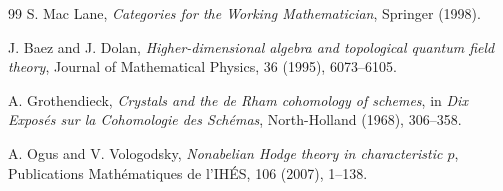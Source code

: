 \documentclass[12pt]{article}
\begin{document}
\begin{thebibliography}{99}
S. Mac Lane,
\textit{Categories for the Working Mathematician},
Springer (1998).

J. Baez and J. Dolan,
\textit{Higher-dimensional algebra and topological quantum field theory},
Journal of Mathematical Physics, 36 (1995), 6073--6105.

A. Grothendieck,
\textit{Crystals and the de Rham cohomology of schemes},
in \textit{Dix Expos\'es sur la Cohomologie des Sch\'emas},
North-Holland (1968), 306--358.

A. Ogus and V. Vologodsky,
\textit{Nonabelian Hodge theory in characteristic $p$},
Publications Math\'ematiques de l'IH\'ES, 106 (2007), 1--138.

\end{thebibliography}
\end{document}

